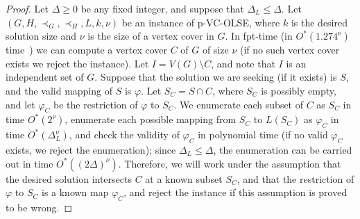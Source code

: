 \documentclass[11pt]{article}
\let\phi=\varphi
\begin{document}
\begin{proof}
Let $\Delta \geq 0$ be any fixed integer, and suppose that $\Delta_L \leq \Delta$. Let $(G, H, \prec_G, \prec_H, L, k, \nu)$ be an instance of p-VC-OLSE, where $k$ is the desired solution size and $\nu$ is the size of a vertex cover in $G$. In fpt-time (in $O^*(1.274^\nu)$ time~\cite{ckxvc}) we can compute a vertex cover $C$ of $G$ of size $\nu$ (if no such vertex cover exists we reject the instance). Let $I = V(G) \setminus C$, and note that $I$ is an independent set of $G$. Suppose that the solution we are seeking (if it exists) is $S$, and the valid mapping of $S$ is $\phi$. Let $S_C = S \cap C$, where $S_C$ is possibly empty, and let $\phi_C$ be the restriction of $\phi$ to $S_C$. We enumerate each subset of $C$ as $S_C$ in time $O^*(2^\nu)$, enumerate each possible mapping from $S_C$ to $L(S_C)$ as $\phi_C$ in time $O^*(\Delta_L^\nu)$, and check the validity of $\phi_C$ in polynomial time (if no valid $\phi_C$ exists, we reject the enumeration); since $\Delta_L \leq \Delta$, the enumeration can be carried out in time $O^*((2\Delta)^{\nu})$. Therefore, we will work under the assumption that the desired solution intersects $C$ at a known subset $S_C$, and that the restriction of $\phi$ to $S_C$ is a known map $\phi_C$, and reject the instance if this assumption is proved to be wrong.


\end{proof}
\end{document}
